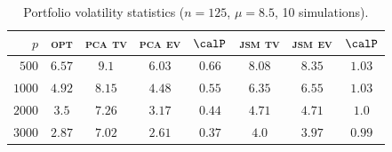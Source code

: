 \begin{table}[hpt!] 
\begin{center} 
\begin{tabular}{rccccccc} 
\toprule 
$p$ & \textsc{opt}  & \textsc{pca tv} & \textsc{pca ev} & $\calP$ & \textsc{jsm tv} & \textsc{jsm ev} & $\calP$ \\ 
\midrule 
$500$ & $6.57$ & $9.1$ & $6.03$ & $0.66$ & $8.08$ & $8.35$ & $1.03$ \\ 
$1000$ & $4.92$ & $8.15$ & $4.48$ & $0.55$ & $6.35$ & $6.55$ & $1.03$ \\ 
$2000$ & $3.5$ & $7.26$ & $3.17$ & $0.44$ & $4.71$ & $4.71$ & $1.0$ \\ 
$3000$ & $2.87$ & $7.02$ & $2.61$ & $0.37$ & $4.0$ & $3.97$ & $0.99$ \\ 
\bottomrule 
\end{tabular} 
\end{center} 
\caption{Portfolio volatility statistics ($n = 125$, $\mu = 8.5$,  10 simulations).} 
\label{tab:vol} 
\end{table} 

 
